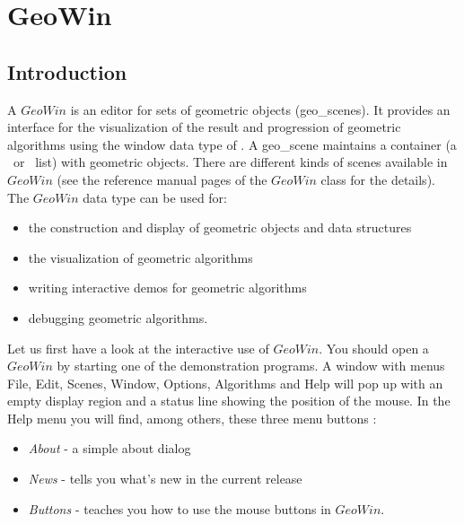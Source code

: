 
%

\ccParDims

\chapter{GeoWin}
\label{chapterGeoWin}


\section{Introduction}

A $GeoWin$ is an editor for sets of geometric objects (geo\_scenes). It provides an interface for the visualization 
of the result and progression of geometric algorithms using the window data type of \leda.
A geo\_scene maintains a container (a \stl\ or \leda\ list) with geometric objects.
There are different kinds of scenes available in $GeoWin$ (see the reference manual pages of the
$GeoWin$ class for the details).
The $GeoWin$ data type can be used for:

\begin{itemize}

\item the construction and display of geometric objects and data structures
\item the visualization of geometric algorithms
\item writing interactive demos for geometric algorithms
\item debugging geometric algorithms.

\end{itemize}

Let us first have a look at the interactive use of $GeoWin$. You should open a $GeoWin$ by starting
one of the demonstration programs. A window with menus File, Edit, Scenes, Window, Options,
Algorithms and Help will pop up with an empty display region and a status line showing 
the position of the mouse.
In the Help menu you will find, among others, these three menu buttons :

\begin{itemize}
\item {\em About}    - a simple about dialog
\item {\em News}     - tells you what's new in the current release
\item {\em Buttons}  - teaches you how to use the mouse buttons in $GeoWin$.
\end{itemize}

